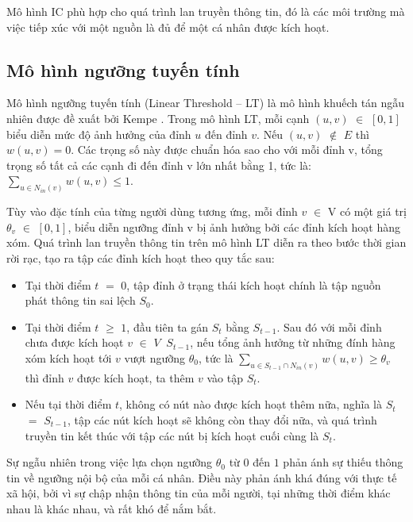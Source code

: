 	Mô hình IC phù hợp cho quá trình lan truyền thông tin, đó là các môi trường mà việc tiếp xúc với một nguồn là đủ để một cá nhân được kích hoạt.
	
	\subsection{Mô hình ngưỡng tuyến tính}
	Mô hình ngưỡng tuyến tính (Linear Threshold – LT) là mô hình khuếch tán ngẫu nhiên được đề xuất bởi Kempe \cite{kemple1}. Trong mô hình LT, mỗi cạnh $(u,v)$ $\in$ $[0,1]$ biểu diễn mức độ ảnh hưởng của đỉnh $u$ đến đỉnh $v$. Nếu $(u,v)$ $\notin$ $E$ thì $w(u,v)=0$. Các trọng số này được chuẩn hóa sao cho với mỗi đỉnh v, tổng trọng số tất cả các cạnh đi đến đỉnh v lớn nhất bằng 1, tức là: $\sum_{u\in N_{in}(v)}w(u,v) \leq 1.$ 
	
	Tùy vào đặc tính của từng người dùng tương ứng, mỗi đỉnh $v$ $\in$ V có một giá trị $\theta$$_{v}$ $\in$ $[0,1]$, biểu diễn ngưỡng đỉnh v bị ảnh hưởng bởi các đỉnh kích hoạt hàng xóm. Quá trình lan truyền thông tin trên mô hình LT diễn ra theo bước thời gian rời rạc, tạo ra tập các đỉnh kích hoạt theo quy tắc sau:
	\begin {itemize}
		\item Tại thời điểm $t$ $=$ $0$, tập đỉnh ở trạng thái kích hoạt chính là tập nguồn phát thông tin sai lệch $S$$_{0}$.
	
		\item Tại thời điểm $t$ $\geq$ $1$, đầu tiên ta gán $S$$_{t}$ bằng $S$$_{t-1}$. Sau đó với mỗi đỉnh chưa được kích hoạt $v$ $\in$ $V$ $\ S_{t-1}$, nếu tổng ảnh hưởng từ những đính hàng xóm kích hoạt tới $v$ vượt ngưỡng $\theta$$_{0}$, tức là  $\sum_{u\in S_{t-1} \cap N_{in}(v)}w(u,v) \geq \theta_{v}$ thì đỉnh $v$ được kích hoạt, ta thêm $v$ vào tập $S$$_{t}$.
	
		\item Nếu tại thời điểm $t$, không có nút nào được kích hoạt thêm nữa, nghĩa là $S$$_{t}$ $=$ $S$$_{t-1}$, tập các nút kích hoạt sẽ không còn thay đổi nữa, và quá trình truyền tin kết thúc với tập các nút bị kích hoạt cuối cùng là $S$$_{t}$.
	\end {itemize}
	
	Sự ngẫu nhiên trong việc lựa chọn ngưỡng $\theta$$_{0}$ từ $0$ đến $1$ phản ánh sự thiếu thông tin về ngưỡng nội bộ của mỗi cá nhân. Điều này phản ánh khá đúng với thực tế xã hội, bởi vì sự chập nhận thông tin của mỗi người, tại những thời điểm khác nhau là khác nhau, và rất khó để nắm bắt. 
	
